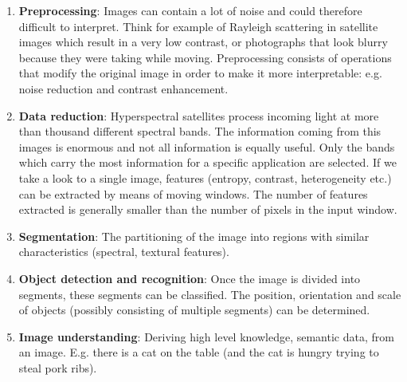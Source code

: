 \begin{enumerate}
	\item \textbf{Preprocessing}:
	Images can contain a lot of noise and could therefore difficult to interpret. Think for example of Rayleigh scattering in satellite images which result in a very low contrast, or photographs that look blurry because they were taking while moving. Preprocessing consists of operations that modify the original image in order to make it more interpretable: e.g. noise reduction and contrast enhancement.
	
	
	\item \textbf{Data reduction}:
Hyperspectral satellites process incoming light at more than thousand different spectral bands. The information coming from this images is enormous and not all information is equally useful. Only the bands which carry the most information for a specific application are selected. If we take a look to a single image, features (entropy, contrast, heterogeneity etc.)  can be extracted by means of moving windows. The number of features extracted is generally smaller than the number of pixels in the input window. 

\item \textbf{Segmentation}:
The partitioning of the image into regions with similar characteristics (spectral, textural features). 

\item \textbf{Object detection and recognition}:
Once the image is divided into segments, these segments can be classified. The position, orientation and scale of objects (possibly consisting of multiple segments) can be determined. 

\item \textbf{Image understanding}:
Deriving high level knowledge, semantic data, from an image. E.g. there is a cat on the table (and the cat is hungry trying to steal pork ribs).

\end{enumerate}

